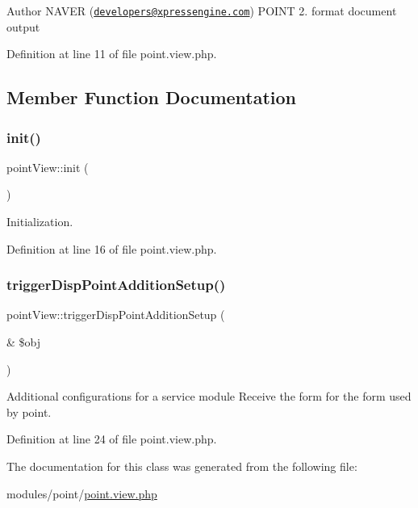 \begin{DoxyAuthor}{Author}
N\+A\+V\+ER (\href{mailto:developers@xpressengine.com}{\tt developers@xpressengine.\+com}) P\+O\+I\+NT 2. format document output 
\end{DoxyAuthor}


Definition at line 11 of file point.\+view.\+php.



\subsection{Member Function Documentation}
\mbox{\label{classpointView_aa86b46a942ef2352a7db0019de88368a}} 
\subsubsection{\texorpdfstring{init()}{init()}}
{\footnotesize\ttfamily point\+View\+::init (\begin{DoxyParamCaption}{ }\end{DoxyParamCaption})}



Initialization. 



Definition at line 16 of file point.\+view.\+php.

\mbox{\label{classpointView_a9249042127504b50e7c92cdff40a8ac5}} 
\subsubsection{\texorpdfstring{trigger\+Disp\+Point\+Addition\+Setup()}{triggerDispPointAdditionSetup()}}
{\footnotesize\ttfamily point\+View\+::trigger\+Disp\+Point\+Addition\+Setup (\begin{DoxyParamCaption}\item[{\&}]{\$obj }\end{DoxyParamCaption})}



Additional configurations for a service module Receive the form for the form used by point. 



Definition at line 24 of file point.\+view.\+php.



The documentation for this class was generated from the following file\+:\begin{DoxyCompactItemize}
\item 
modules/point/\hyperlink{point_8view_8php}{point.\+view.\+php}\end{DoxyCompactItemize}
